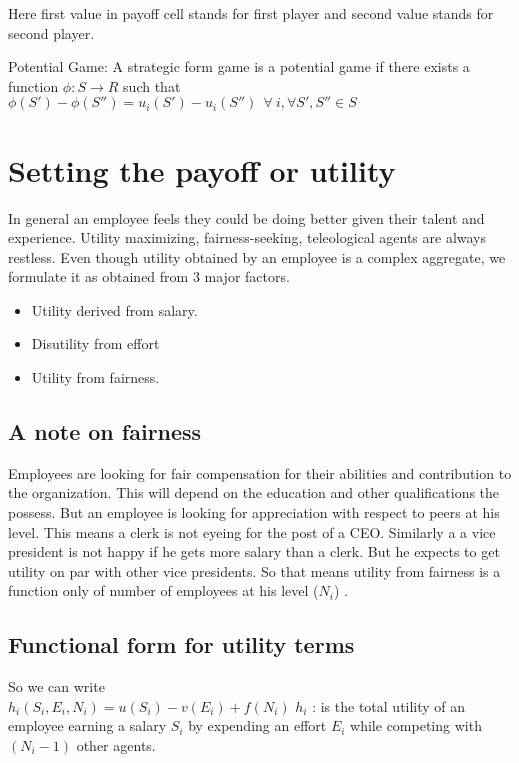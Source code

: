 \documentclass[letterpaper,english,12pt]{article}
\begin{document}
Here first value in payoff cell stands for first player and second value stands for second player.
\begin{defn}
Potential Game: A strategic form game is a potential game if there exists a function $\phi:S \to R $ such that $\phi(S')-\phi(S'') = u_i(S') - u_i(S'')~~
\forall~i , \forall S', S'' \in S $
\end{defn}

\section{Setting the payoff or utility}
In general an employee feels they could be doing better given their talent and experience. Utility maximizing, fairness-seeking, teleological agents are always restless. Even though utility obtained by an employee is a complex aggregate, we formulate it as obtained from 3 major factors. 
\begin{itemize}
    \item Utility derived from salary.
    \item Disutility from effort
    \item Utility from fairness.
    
\end{itemize}
\subsection{A note on fairness}
Employees are looking for fair compensation for their abilities and contribution to the organization. This will depend on the education and other qualifications the possess. But an employee is looking for appreciation with respect to peers at his level. This means a clerk is not eyeing for the post of a CEO. Similarly a a vice president is not happy if he gets more salary than a clerk. But he expects to get utility on par with other vice presidents. So that means utility from fairness is a function only of number of employees at his level ($N_i$) . 
\subsection{Functional form for utility terms}
So we can write \\
$h_i(S_i,E_i,N_i) = u(S_i) - v(E_i) + f(N_i)$
$h_i$ : is the total utility of an employee earning a salary $S_i$ by expending an effort $E_i$ while competing with $(N_i -1) $ other agents. \\
\end{document}
